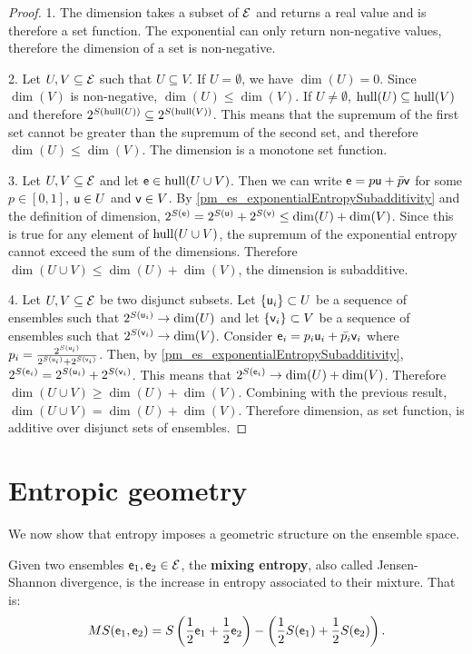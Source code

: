 \begin{proof}
	1. The dimension takes a subset of $\Ens$ and returns a real value and is therefore a set function. The exponential can only return non-negative values, therefore the dimension of a set is non-negative. 
	
	2. Let $U, V \subseteq \Ens$ such that $U \subseteq V$. If $U = \emptyset$, we have $\dim(U) = 0$. Since $\dim(V)$ is non-negative, $\dim(U) \leq \dim(V)$. If $U \neq \emptyset$, $\hull(U) \subseteq \hull(V)$ and therefore $2^{S(\hull(U))} \subseteq 2^{S(\hull(V))}$. This means that the supremum of the first set cannot be greater than the supremum of the second set, and therefore $\dim(U) \leq \dim(V)$. The dimension is a monotone set function.
	
	3. Let $U, V \subseteq \Ens$ and let $\ens \in \hull(U \cup V)$. Then we can write $\ens = p \ens[u] + \bar{p} \ens[v]$ for some $p \in [0,1]$, $\ens[u] \in U$ and $\ens[v] \in V$. By \ref{pm_es_exponentialEntropySubadditivity} and the definition of dimension, $2^{S(\ens)} = 2^{S(\ens[u])} + 2^{S(\ens[v])} \leq \dim(U) + \dim(V)$. Since this is true for any element of $\hull(U \cup V)$, the supremum of the exponential entropy cannot exceed the sum of the dimensions. Therefore $\dim(U \cup V) \leq \dim(U) + \dim(V)$, the dimension is subadditive.
	
	4. Let $U, V \subseteq \Ens$ be two disjunct subsets. Let $\{\ens[u]_i\} \subset U$ be a sequence of ensembles such that $2^{S(\ens[u]_i)} \to \dim(U)$ and let $\{\ens[v]_i\} \subset V$ be a sequence of ensembles such that $2^{S(\ens[v]_i)} \to \dim(V)$. Consider $\ens_i = p_i \ens[u]_i + \bar{p_i} \ens[v]_i$ where $p_i = \frac{2^{S(\ens[u]_i)}}{2^{S(\ens[u]_i)} + 2^{S(\ens[v]_i)}}$. Then, by \ref{pm_es_exponentialEntropySubadditivity}, $2^{S(\ens_i)} = 2^{S(\ens[u]_i)} + 2^{S(\ens[v]_i)}$. This means that $2^{S(\ens_i)} \to \dim(U) + \dim(V)$. Therefore $\dim(U \cup V) \geq \dim(U) + \dim(V)$. Combining with the previous result, $\dim(U \cup V) = \dim(U) + \dim(V)$. Therefore dimension, as set function, is additive over disjunct sets of ensembles.
\end{proof}

\section{Entropic geometry}

We now show that entropy imposes a geometric structure on the ensemble space.

\begin{defn}
	Given two ensembles $\ens_1, \ens_2 \in \Ens$, the \textbf{mixing entropy}, also called Jensen-Shannon divergence, is the increase in entropy associated to their mixture. That is:
	$$MS(\ens_1, \ens_2) = S\left(\frac{1}{2}\ens_1 + \frac{1}{2} \ens_2\right) - \left(\frac{1}{2} S(\ens_1) + \frac{1}{2} S(\ens_2)\right).$$
\end{defn}

